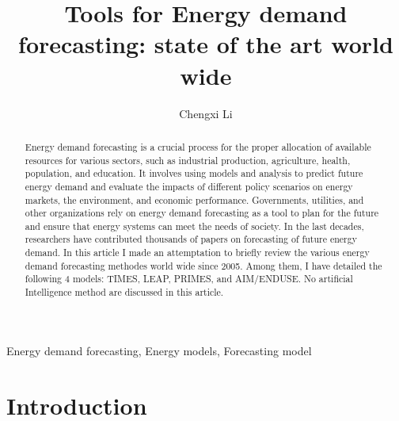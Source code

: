 \documentclass[lettersize,journal]{IEEEtran}
\begin{document}
\title{Tools for Energy demand forecasting: state of the art world wide}
\author{Chengxi Li}


\maketitle

\begin{abstract}
  Energy demand forecasting is a crucial process for the proper allocation of available resources for various sectors, such as industrial production, agriculture, health, population, and education. It involves using models and analysis to predict future energy demand and evaluate the impacts of different policy scenarios on energy markets, the environment, and economic performance. Governments, utilities, and other organizations rely on energy demand forecasting as a tool to plan for the future and ensure that energy systems can meet the needs of society. In the last decades, researchers have contributed thousands of papers on forecasting of future energy demand. In this article I made an attemptation to briefly review the various energy demand forecasting methodes world wide since 2005. Among them, I have detailed the following 4 models: TIMES, LEAP, PRIMES, and AIM/ENDUSE. No artificial Intelligence method are discussed in this article.
  
\end{abstract}

\begin{IEEEkeywords}
Energy demand forecasting, Energy models, Forecasting model
\end{IEEEkeywords}


\section{Introduction}
\end{document}
